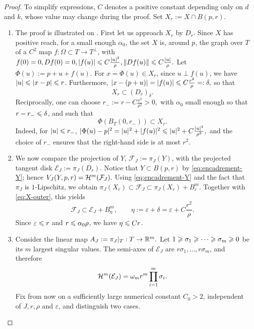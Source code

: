 \begin{proof}
To simplify expressions, $C$ denotes a positive constant depending only
on $d$ and $k$, whose value may change during the proof. Set
$X_r:=X\cap B(p,r)$.
\begin{enumerate}
\item The proof is illustrated on
  . First let us approach $X_r$ by
  $D_r$. Since $X$ has positive reach, for a small enough
  $\alpha_0$, the set $X$ is, around $p$, the graph over
  $T$ of a $C^2$ map $f:\Omega\subset T\to T^\perp$, with \(f(0)=0,
  Df(0)=0, |f(u)|\leqslant C\frac{|u|^2}{\rho}, \|Df(u)\|\leqslant
  C\frac{|u|}{\rho}.\) Let $\Phi(u):=p+u+f(u)$. For $x=\Phi(u)\in
  X_r$, since $u\perp f(u)$, we have $|u|\leqslant |x-p|\leqslant r$. Furthermore,
  \(|x-(p+u)|=|f(u)|\leqslant C\frac{r^2}{\rho}=: \delta,\) so that
\begin{equation}
\label{eq:X-outer}
 X_r\subset (D_r)_\delta.
\end{equation}
Reciprocally, one can choose
\(r_-:=r-C\frac{r^3}{\rho^2}>0,\)
with $\alpha_0$ small enough so that $r-r_-\leqslant\delta$, and such that
\begin{equation}
\label{eq:inner-graph}
 \Phi(B_T(0,r_-))\subset X_r.
\end{equation}
Indeed, for $|u|\leqslant r_-$,
\(|\Phi(u)-p|^2=|u|^2+|f(u)|^2 \leqslant |u|^2+C\frac{|u|^4}{\rho^2},\)
and the choice of $r_-$ ensures that the right-hand side is at most
$r^2$.

\item We now compare the projection of $Y$,
$\mathcal F_J:=\pi_J(Y)$, with the projected tangent disk
$\mathcal E_J:=\pi_J(D_r)$. Notice that $Y\subset B(p,r)$ by
\eqref{eq:encadrement-Y}; hence
\(V_J(Y,p,r)=\mathcal{H}^m(\mathcal F_J).\)
Using \eqref{eq:encadrement-Y} and the fact that $\pi_J$ is
$1$-Lipschitz, we obtain
\(\pi_J(X_r)\subset\mathcal F_J \subset \pi_J(X_r)+B^m_\varepsilon.\)
Together with \eqref{eq:X-outer}, this yields
\begin{equation}
\label{eq:outer-projection}
 \mathcal F_J\subset\mathcal E_J+B^m_\eta,
 \qquad
 \eta:=\varepsilon+\delta
 =\varepsilon+C\frac{r^2}{\rho}.
\end{equation}
Since $\varepsilon\leqslant r$ and $r\leqslant\alpha_0\rho$, we have
$\eta\leqslant C r$.

\item Consider the linear map
\(A_J:=\pi_J|_T:T\to\mathbb{R}^m.\)
Let $1\geqslant\sigma_1\geqslant\cdots\geqslant\sigma_m\geqslant0$ be its $m$ largest
singular values. The semi-axes of $\mathcal E_J$ are
$r\sigma_1,\ldots,r\sigma_m$, and therefore
\begin{equation}
\label{eq:ellipsoid-volume}
 \mathcal{H}^m(\mathcal E_J)
 =\omega_m r^m\prod_{i=1}^m\sigma_i.
\end{equation}
Fix from now on a sufficiently large numerical constant $C_0>2$,
independent of $J,r,\rho$ and $\varepsilon$, and distinguish two cases.


\end{enumerate}
\end{proof}
